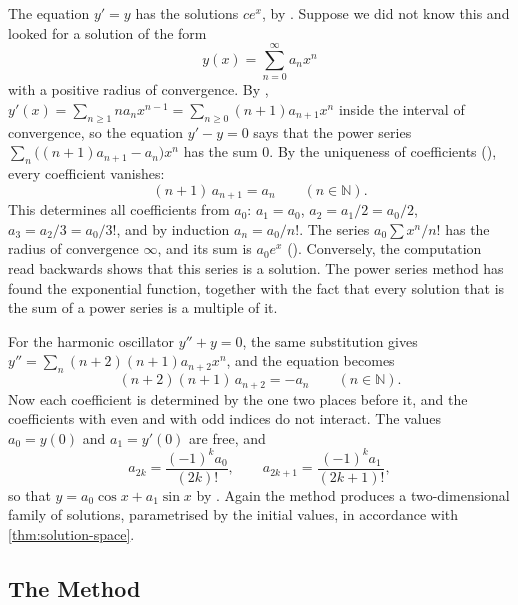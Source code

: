 The equation $y'=y$ has the solutions $ce^x$, by . Suppose we did not know this and looked for a solution of the form
\[
y(x)=\sum_{n=0}^\infty a_nx^n
\]
with a positive radius of convergence. By , $y'(x)=\sum_{n\ge1}na_nx^{n-1}=\sum_{n\ge0}(n+1)a_{n+1}x^n$ inside the interval of convergence, so the equation $y'-y=0$ says that the power series $\sum_n\bigl((n+1)a_{n+1}-a_n\bigr)x^n$ has the sum $0$. By the uniqueness of coefficients (), every coefficient vanishes:
\[
(n+1)\,a_{n+1}=a_n\qquad(n\in\mathbb N).
\]
This  determines all coefficients from $a_0$: $a_1=a_0$, $a_2=a_1/2=a_0/2$, $a_3=a_2/3=a_0/3!$, and by induction $a_n=a_0/n!$. The series $a_0\sum x^n/n!$ has the radius of convergence $\infty$, and its sum is $a_0e^x$ (). Conversely, the computation read backwards shows that this series is a solution. The power series method has found the exponential function, together with the fact that every solution that is the sum of a power series is a multiple of it.

For the harmonic oscillator $y''+y=0$, the same substitution gives $y''=\sum_n(n+2)(n+1)a_{n+2}x^n$, and the equation becomes
\[
(n+2)(n+1)\,a_{n+2}=-a_n\qquad(n\in\mathbb N).
\]
Now each coefficient is determined by the one two places before it, and the coefficients with even and with odd indices do not interact. The values $a_0=y(0)$ and $a_1=y'(0)$ are free, and
\[
a_{2k}=\frac{(-1)^ka_0}{(2k)!},\qquad a_{2k+1}=\frac{(-1)^ka_1}{(2k+1)!},
\]
so that $y=a_0\cos x+a_1\sin x$ by . Again the method produces a two-dimensional family of solutions, parametrised by the initial values, in accordance with \cref{thm:solution-space}.

\subsection{The Method}

